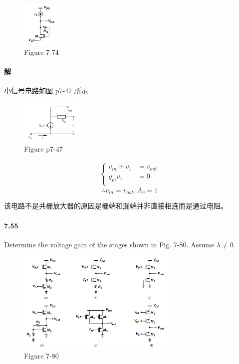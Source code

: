 \documentclass[hyperref, UTF8]{ctexart}
\begin{document}
    \begin{figure}[!htb]
        \centering
        \includegraphics[width=0.154\textwidth]{p7-74.png}
        \caption*{Figure 7-74}
    \end{figure}

\paragraph{解} 小信号电路如图 p7-47 所示
    \begin{figure}[!htb]
        \centering
        \includegraphics[width=0.267\textwidth]{p7-47-sol.png}
        \caption*{Figure p7-47}
    \end{figure}
    \begin{gather*}
        \left\{ \begin{aligned}
            v_{in}+v_1 & = v_{out} \\
            g_mv_1 & = 0 \\
        \end{aligned}\right.
    \end{gather*}
    $$\therefore v_{in}=v_{out}, A_v = 1$$

    该电路不是共栅放大器的原因是栅端和漏端并非直接相连而是通过电阻。
    
\paragraph{7.55}\label{7.55}
    Determine the voltage gain of the stages shown in Fig. 7-80. Assume $\lambda \neq 0$.

    \begin{figure}[!htb]
        \centering
        \includegraphics[width=0.682\textwidth]{p7-80.png}
        \caption*{Figure 7-80}
    \end{figure}
\end{document}
